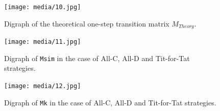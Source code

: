 \documentclass[12pt]{article}
\begin{document}
\begin{figure}
    \centering
    \texttt{[image: media/10.jpg]}
    \caption{Digraph of the theoretical one-step transition matrix $M_{Theory}$.}
    \label{fig:myimage}
\end{figure}

\begin{figure}
    \centering
    \texttt{[image: media/11.jpg]}
    \caption{Digraph of \texttt{Msim} in the case of All-C, All-D and Tit-for-Tat strategies.}
    \label{fig:myimage}
\end{figure}

\begin{figure}
    \centering
    \texttt{[image: media/12.jpg]}
    \caption{Digraph of \texttt{Mk} in the case of All-C, All-D and Tit-for-Tat strategies.}
    \label{fig:myimage}
\end{figure}
\end{document}
